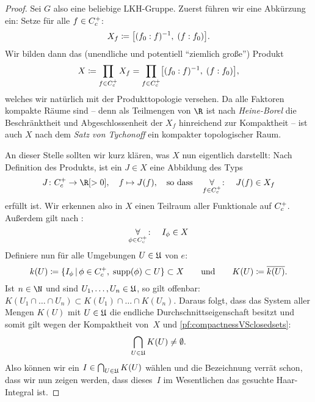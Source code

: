 \begin{proof}
    Sei $G$ also eine beliebige LKH-Gruppe. Zuerst führen wir eine Abkürzung
    ein: Setze für alle $f\in C_c^+$:
    \[ X_f \coloneqq \bigl[ (f_0 : f)^{-1}, \; (f : f_0) \bigr] . \]
    Wir bilden dann das (unendliche und potentiell \enquote{ziemlich große})
    Produkt
    \[ X \coloneqq \prod_{f\in C_c^+} X_f =
        \prod_{f\in C_c^+} \bigl[ (f_0 : f)^{-1}, \; (f : f_0) \bigr]
    , \]
    welches wir natürlich mit der Produkttopologie versehen. Da alle Faktoren
    kompakte Räume sind -- denn als Teilmengen von $\R$ ist nach
    \emph{Heine-Borel} die Beschränktheit und Abgeschlossenheit der $X_f$
    hinreichend zur Kompaktheit -- ist auch $X$ nach dem \emph{Satz von
    Tychonoff} ein kompakter topologischer Raum. 
    
    An dieser Stelle sollten wir kurz klären, was $X$ nun eigentlich darstellt:
    Nach Definition des Produkts, ist ein $J\in X$ eine Abbildung des Typs
    \[  J\colon\contcompplus\to\R[>0], \quad f \mapsto J(f) ,
        \qtextq{so dass}
        \forAll_{f\in\contcompplus}\colon\quad J(f) \in X_f 
    \]
    erfüllt ist. Wir erkennen also in $X$ einen Teilraum aller Funktionale auf
    $C_c^+$.
    Außerdem gilt nach :
    \[ \operatorname*{\forall}_{\phi\in C_c^+}\colon\quad I_\phi \in X \]
    Definiere nun für alle Umgebungen $U\in\mathfrak{U}$ von $e$:
    \[  k(U) \defeq 
        \{ I_\phi \Mid \phi\in\contcompplus,\;
                                     \supp(\phi) \subset U 
        \} \subset X
        \qqundqq
        K(U) \defeq \setclosure{k(U)} 
    . \]
    Ist $n\in\N$ und sind $U_1,\ldots,U_n\in\mathfrak{U}$, so gilt offenbar:
    $K(U_1\cap \ldots \cap U_n) \subset K(U_1) \cap \ldots \cap K(U_n)$. Daraus
    folgt, dass das System aller Mengen $K(U)$ mit $U\in\mathfrak{U}$ die endliche
    Durchschnittseigenschaft besitzt und somit gilt wegen der Kompaktheit von~$X$
    und \cref{pf:compactnessVSclosedsets}: 
    \[ \bigcap_{U\in\mathfrak{U}} K(U)\neq\emptyset . \] Also können wir ein 
    $I\in\bigcap_{U\in\mathfrak{U}} K(U)$ wählen und die Bezeichnung verrät schon,
    dass wir nun zeigen werden, dass dieses~$I$ im Wesentlichen das gesuchte
    Haar-Integral ist.
    

\end{proof}
